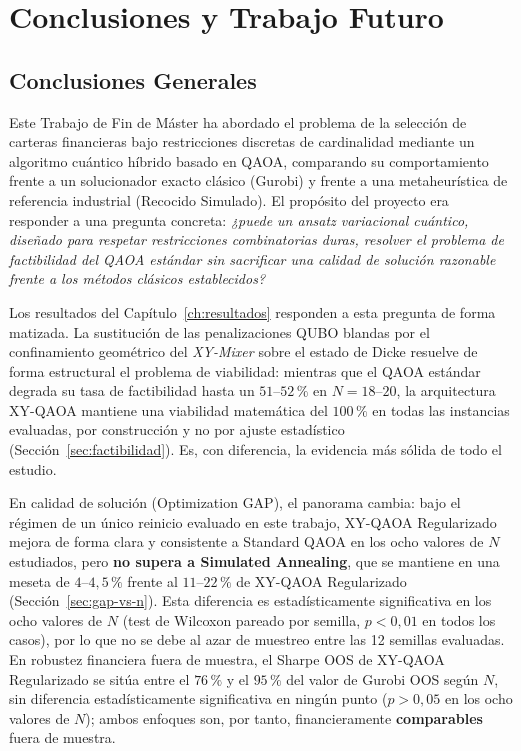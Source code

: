 \chapter{Conclusiones y Trabajo Futuro}
\label{chap:conclusiones}

\section{Conclusiones Generales}
\label{sec:conclusiones_generales}

Este Trabajo de Fin de Máster ha abordado el problema de la selección de carteras financieras bajo restricciones
discretas de cardinalidad mediante un algoritmo cuántico híbrido basado en QAOA, comparando su comportamiento
frente a un solucionador exacto clásico (Gurobi) y frente a una metaheurística de referencia industrial (Recocido
Simulado). El propósito del proyecto era responder a una pregunta concreta: \emph{¿puede un ansatz variacional
cuántico, diseñado para respetar restricciones combinatorias duras, resolver el problema de factibilidad del QAOA
estándar sin sacrificar una calidad de solución razonable frente a los métodos clásicos establecidos?}

Los resultados del Capítulo~\ref{ch:resultados} responden a esta pregunta de forma matizada. La sustitución de
las penalizaciones QUBO blandas por el confinamiento geométrico del \emph{XY-Mixer} sobre el estado de Dicke
resuelve de forma estructural el problema de viabilidad: mientras que el QAOA estándar degrada su tasa de
factibilidad hasta un $51\text{--}52\,\%$ en $N=18\text{--}20$, la arquitectura XY-QAOA mantiene una viabilidad
matemática del $100\,\%$ en todas las instancias evaluadas, por construcción y no por ajuste estadístico
(Sección~\ref{sec:factibilidad}). Es, con diferencia, la evidencia más sólida de todo el estudio.

En calidad de solución (Optimization GAP), el panorama cambia: bajo el régimen de un único reinicio evaluado en
este trabajo, XY-QAOA Regularizado mejora de forma clara y consistente a Standard QAOA en los ocho valores de
$N$ estudiados, pero \textbf{no supera a Simulated Annealing}, que se mantiene en una meseta de
$4\text{--}4{,}5\,\%$ frente al $11\text{--}22\,\%$ de XY-QAOA Regularizado (Sección~\ref{sec:gap-vs-n}). Esta
diferencia es estadísticamente significativa en los ocho valores de $N$ (test de Wilcoxon pareado por semilla,
$p<0{,}01$ en todos los casos), por lo que no se debe al azar de muestreo entre las 12 semillas evaluadas. En
robustez financiera fuera de muestra, el Sharpe OOS de XY-QAOA Regularizado se sitúa entre el $76\,\%$ y el
$95\,\%$ del valor de Gurobi OOS según $N$, sin diferencia estadísticamente significativa en ningún punto
($p>0{,}05$ en los ocho valores de $N$); ambos enfoques son, por tanto, financieramente \textbf{comparables}
fuera de muestra.

